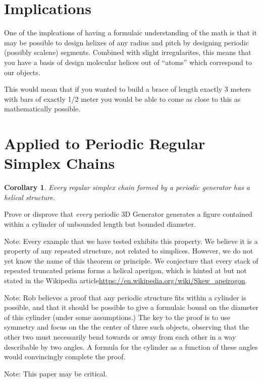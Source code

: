 \documentclass[11pt]{article}
\newtheorem{corollary}{Corollary}
\begin{document}
\section{Implications}

One of the implcations of having a formulaic understanding of the math
is that it may be possible to design helixes
of any radius and pitch by designing periodic (possibly scalene) segments. Combined with slight
irregularites, this means that you have a basis of design molecular helices
out of ``atoms'' which correspond to our objects.

This would mean that if you wanted to build a brace of length exactly 3 meters
with bars of exactly 1/2 meter you would be able to come as close to this
as mathematically possible.






\section{Applied to Periodic Regular Simplex Chains}

\begin{corollary}
  Every regular simplex chain formed by a periodic generator has a helical structure.
  \end{corollary}

Prove or disprove that {\em every} periodic 3D Generator generates a figure contained within a cylinder of unbounded length but bounded diameter.

Note: Every example that we have tested exhibits this property. We believe it is a property of any repeated structure, not related to simplices.
However, we do not yet know the name of this theorem or principle. We conjecture that every stack of repeated truncated prisms
forms a helical aperigon, which is hinted at but not stated in the Wikipedia article\url{https://en.wikipedia.org/wiki/Skew_apeirogon}.

Note: Rob believes a proof that any periodic structure fits within a cylinder is possible, and that it should be possible to give a formulaic bound
on the diameter of this cylinder (under some assumptions.) The key to the proof is to use symmetry and focus on the the center of three
such objects, observing that the other two must necessarily bend towards or away from each other in a way describable by two angles.
A formula for the cylinder as a function of these angles would convincingly complete the proof.

Note: This paper may be critical.
\end{document}
